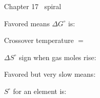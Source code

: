 \documentclass{apchem-worksheet}
\begin{document}
\begin{spiralstrip}{Chapter 17 \textbullet\ spiral}
  \item Favored means $\Delta G^\circ$ is: 
  \item Crossover temperature $=$ 
  \item $\Delta S^\circ$ sign when gas moles rise:
  \item Favored but very slow means: 
  \item $S^\circ$ for an element is: 
\end{spiralstrip}
\end{document}
